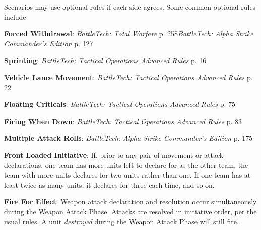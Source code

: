 Scenarios may use optional rules if each side agrees.
Some common optional rules include

\begin{description}

\item {\bfseries Forced Withdrawal}: \emph{BattleTech: Total Warfare} p. 258\emph{BattleTech: Alpha Strike Commander's Edition} p. 127

\item {\bfseries Sprinting}: \emph{BattleTech: Tactical Operations Advanced Rules} p. 16

\item {\bfseries Vehicle Lance Movement}: \emph{BattleTech: Tactical Operations Advanced Rules} p. 22

\item {\bfseries Floating Criticals}: \emph{BattleTech: Tactical Operations Advanced Rules} p. 75

\item {\bfseries Firing When Down}: \emph{BattleTech: Tactical Operations Advanced Rules} p. 83

\item {\bfseries Multiple Attack Rolls}: \emph{BattleTech: Alpha Strike Commander's Edition} p. 175

\item {\bfseries Front Loaded Initiative}: If, prior to any pair of movement or attack declarations, one team has more units left to declare for as the other team, the team with more units declares for two units rather than one.
If one team has at least twice as many units, it declares for three each time, and so on.

\item {\bfseries Fire For Effect}: Weapon attack declaration and resolution occur simultaneously during the Weapon Attack Phase.
Attacks are resolved in initiative order, per the usual rules.
A unit \emph{destroyed} during the Weapon Attack Phase will still fire.

\end{description}

